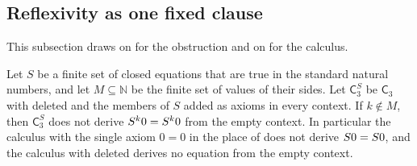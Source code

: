 \subsection{Reflexivity as one fixed clause}
\label{claus:sec:uniform}

This subsection draws on  for the obstruction and on
 for the calculus.

\begin{theorem}
\label{claus:thm:reflobs}
Let $S$ be a finite set of closed equations that are true in the standard
natural numbers, and let $M\subseteq\mathbb{N}$ be the finite set of values
of their sides. Let $\mathsf{C}_3^{S}$ be $\mathsf{C}_3$ with
 deleted and the members of $S$ added as axioms in every
context. If $k\notin M$, then $\mathsf{C}_3^{S}$ does not derive
$S^k0=S^k0$ from the empty context. In particular the calculus with
the single axiom $0=0$ in the place of  does not derive
$S 0=S 0$, and the calculus with  deleted derives no
equation from the empty context.
\end{theorem}

